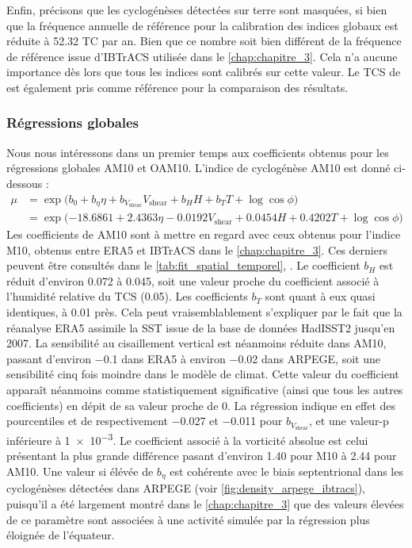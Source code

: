 \documentclass[../main.tex]{subfiles}
\begin{document}
Enfin, précisons que les cyclogénèses détectées sur terre sont masquées, si bien que la fréquence annuelle de référence pour la calibration des indices globaux
est réduite à \num{52.32} TC par an. Bien que ce nombre soit bien différent de la fréquence de référence issue d'IBTrACS utilisée dans le \cref{chap:chapitre_3}.
Cela n'a aucune importance dès lors que tous les indices sont calibrés sur cette valeur. Le TCS de \textcite{tippett_poisson_2011} est également pris comme
référence pour la comparaison des résultats.

\subsubsection{Régressions globales}

Nous nous intéressons dans un premier temps aux coefficients obtenus pour les régressions globales AM10 et OAM10. L'indice de cyclogénèse AM10 est donné
ci-dessous :
%
\begin{align*}
\tag{AM10}
    \mu &= \exp \big( b_0 + b_\eta \eta + b_{V_{\mathrm{shear}}} V_{\mathrm{shear}} + b_H H + b_T T + \log \cos \phi \big)\\
        &= \exp \big( \num{-18.6861} + \num{2.4363} \eta - \num{0.0192} V_{\mathrm{shear}} + \num{0.0454} H + \num{0.4202} T + \log \cos \phi \big)
\end{align*}
%
Les coefficients de AM10 sont à mettre en regard avec ceux obtenus pour l'indice M10, obtenus entre ERA5 et IBTrACS dans le \cref{chap:chapitre_3}. Ces derniers
peuvent être consultés dans le \cref{tab:fit_spatial_temporel}, . Le coefficient $b_H$ est réduit d'environ \num{0.072} à
\num{0.045}, soit une valeur proche du coefficient associé à l'humidité relative du TCS (\num{0.05}). Les coefficients $b_T$ sont quant à eux quasi identiques,
à \num{0.01} près. Cela peut vraisemblablement s'expliquer par le fait que la réanalyse ERA5 assimile la SST issue de la base de données HadISST2
jusqu'en \num{2007}. La sensibilité au cisaillement vertical est néanmoins réduite dans AM10, passant d'environ \num{-0.1} dans ERA5 à environ \num{-0.02} dans
ARPEGE, soit une sensibilité cinq fois moindre dans le modèle de climat. Cette valeur du coefficient apparaît néanmoins comme statistiquement significative
(ainsi que tous les autres coefficients) en dépit de sa valeur proche de \num{0}. La régression indique en effet des pourcentiles  et  de
respectivement \num{-0.027} et \num{-0.011} pour $b_{V_{\mathrm{shear}}}$, et une valeur-p inférieure à \num{1e-3}. Le coefficient associé à la vorticité
absolue est celui présentant la plus grande différence pasant d'environ \num{1.40} pour M10 à \num{2.44} pour AM10. Une valeur si élévée de $b_\eta$ est
cohérente avec le biais septentrional dans les cyclogénèses détectées dans ARPEGE (voir \cref{fig:density_arpege_ibtracs}), puisqu'il a été largement montré
dans le \cref{chap:chapitre_3} que des valeurs élevées de ce paramètre sont associées à une activité simulée par la régression plus éloignée de l'équateur.
\end{document}
